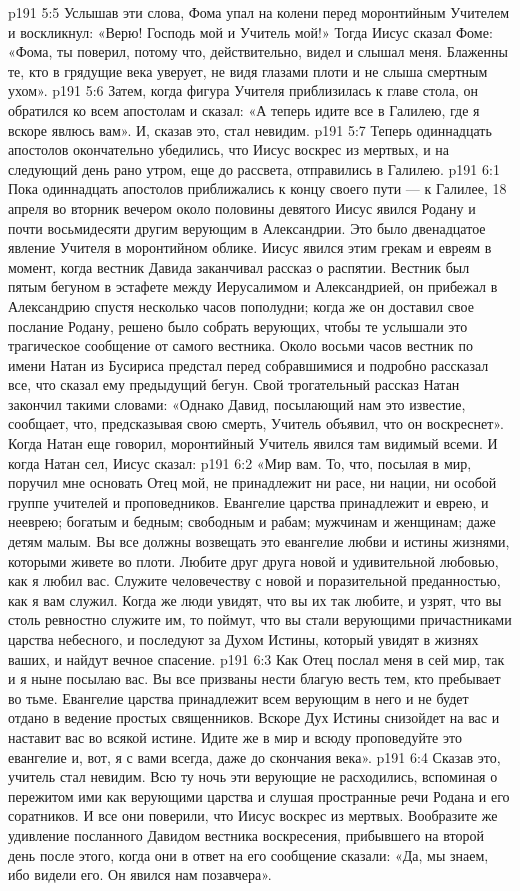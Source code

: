 \vs p191 5:5 Услышав эти слова, Фома упал на колени перед моронтийным Учителем и воскликнул: «Верю! Господь мой и Учитель мой!» Тогда Иисус сказал Фоме: «Фома, ты поверил, потому что, действительно, видел и слышал меня. Блаженны те, кто в грядущие века уверует, не видя глазами плоти и не слыша смертным ухом».
\vs p191 5:6 Затем, когда фигура Учителя приблизилась к главе стола, он обратился ко всем апостолам и сказал: «А теперь идите все в Галилею, где я вскоре явлюсь вам». И, сказав это, стал невидим.
\vs p191 5:7 \pc Теперь одиннадцать апостолов окончательно убедились, что Иисус воскрес из мертвых, и на следующий день рано утром, еще до рассвета, отправились в Галилею.
\vs p191 6:1 Пока одиннадцать апостолов приближались к концу своего пути --- к Галилее, 18 апреля во вторник вечером около половины девятого Иисус явился Родану и почти восьмидесяти другим верующим в Александрии. Это было двенадцатое явление Учителя в моронтийном облике. Иисус явился этим грекам и евреям в момент, когда вестник Давида заканчивал рассказ о распятии. Вестник был пятым бегуном в эстафете между Иерусалимом и Александрией, он прибежал в Александрию спустя несколько часов пополудни; когда же он доставил свое послание Родану, решено было собрать верующих, чтобы те услышали это трагическое сообщение от самого вестника. Около восьми часов вестник по имени Натан из Бусириса предстал перед собравшимися и подробно рассказал все, что сказал ему предыдущий бегун. Свой трогательный рассказ Натан закончил такими словами: «Однако Давид, посылающий нам это известие, сообщает, что, предсказывая свою смерть, Учитель объявил, что он воскреснет». Когда Натан еще говорил, моронтийный Учитель явился там видимый всеми. И когда Натан сел, Иисус сказал:
\vs p191 6:2 «Мир вам. То, что, посылая в мир, поручил мне основать Отец мой, не принадлежит ни расе, ни нации, ни особой группе учителей и проповедников. Евангелие царства принадлежит и еврею, и нееврею; богатым и бедным; свободным и рабам; мужчинам и женщинам; даже детям малым. Вы все должны возвещать это евангелие любви и истины жизнями, которыми живете во плоти. Любите друг друга новой и удивительной любовью, как я любил вас. Служите человечеству с новой и поразительной преданностью, как я вам служил. Когда же люди увидят, что вы их так любите, и узрят, что вы столь ревностно служите им, то поймут, что вы стали верующими причастниками царства небесного, и последуют за Духом Истины, который увидят в жизнях ваших, и найдут вечное спасение.
\vs p191 6:3 Как Отец послал меня в сей мир, так и я ныне посылаю вас. Вы все призваны нести благую весть тем, кто пребывает во тьме. Евангелие царства принадлежит всем верующим в него и не будет отдано в ведение простых священников. Вскоре Дух Истины снизойдет на вас и наставит вас во всякой истине. Идите же в мир и всюду проповедуйте это евангелие и, вот, я с вами всегда, даже до скончания века».
\vs p191 6:4 Сказав это, учитель стал невидим. Всю ту ночь эти верующие не расходились, вспоминая о пережитом ими как верующими царства и слушая пространные речи Родана и его соратников. И все они поверили, что Иисус воскрес из мертвых. Вообразите же удивление посланного Давидом вестника воскресения, прибывшего на второй день после этого, когда они в ответ на его сообщение сказали: «Да, мы знаем, ибо видели его. Он явился нам позавчера».
